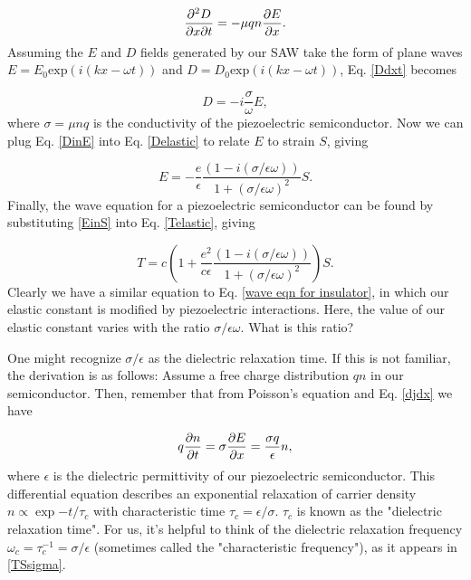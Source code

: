 \documentclass[double,12pt,1in]{beavtex}
\begin{document}
\begin{equation}
    \pdv{D}{x}{t} = -\mu q n \pdv{E}{x}. \label{Ddxt}
\end{equation}
Assuming the $E$ and $D$ fields generated by our SAW take the form of plane waves $E = E_0 \mathrm{exp}(i(kx - \omega t))$ and $D = D_0 \mathrm{exp}(i(kx - \omega t))$, Eq. \ref{Ddxt} becomes

\begin{equation}
    D = -i\frac{\sigma}{\omega} E, \label{DinE}
\end{equation}
where $\sigma = \mu n q$ is the conductivity of the piezoelectric semiconductor. Now we can plug Eq. \ref{DinE} into Eq. \ref{Delastic} to relate $E$ to strain $S$, giving

\begin{equation}
    E = -\frac{e}{\epsilon}\frac{(1-i(\sigma/\epsilon\omega))}{1+(\sigma/\epsilon\omega)^2}S. \label{EinS}
\end{equation}
Finally, the wave equation for a piezoelectric semiconductor can be found by substituting \ref{EinS} into Eq. \ref{Telastic}, giving

\begin{equation}
    T = c(1 + \frac{e^2}{c\epsilon}\frac{(1-i(\sigma/\epsilon\omega))}{1+(\sigma/\epsilon\omega)^2})S. \label{TSsigma}
\end{equation}
Clearly we have a similar equation to Eq. \ref{wave eqn for insulator}, in which our elastic constant is modified by piezoelectric interactions. Here, the value of our elastic constant varies with the ratio $\sigma/\epsilon\omega$. What is this ratio?

One might recognize $\sigma/\epsilon$ as the dielectric relaxation time. If this is not familiar, the derivation is as follows: Assume a free charge distribution $qn$ in our semiconductor. Then, remember that from Poisson's equation and Eq. \ref{djdx} we have

\begin{equation}
    q\pdv{n}{t} = \sigma\pdv{E}{x} = \frac{\sigma q}{\epsilon}n, 
\end{equation}
where $\epsilon$ is the dielectric permittivity of our piezoelectric semiconductor. This differential equation describes an exponential relaxation of carrier density $n \propto \exp{-t/\tau_c}$ with characteristic time $\tau_c = \epsilon/\sigma$. $\tau_c$ is known as the "dielectric relaxation time". For us, it's helpful to think of the dielectric relaxation frequency $\omega_c = \tau_c^{-1} = \sigma/\epsilon$ (sometimes called the "characteristic frequency"), as it appears in \ref{TSsigma}. 
\end{document}

